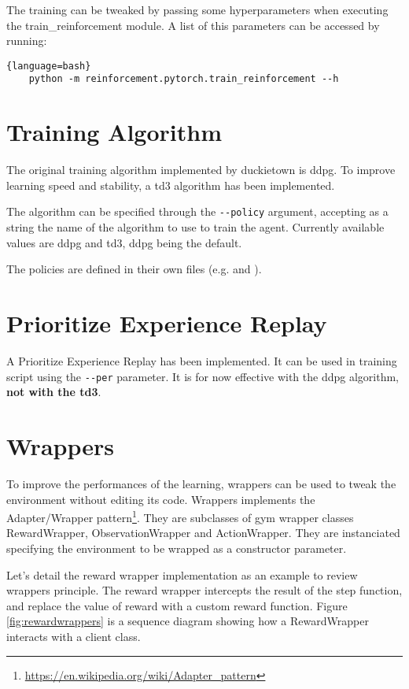 The training can be tweaked by passing some hyperparameters when executing the train\_reinforcement module.
A list of this parameters can be accessed by running:

\begin{lstlisting}{language=bash}
    python -m reinforcement.pytorch.train_reinforcement --h
\end{lstlisting}

\section{Training Algorithm}

The original training algorithm implemented by duckietown is ddpg\cite{ddpg}.
To improve learning speed and stability, a td3\cite{td3} algorithm has been implemented.

The algorithm can be specified through the \lstinline[language=bash]+--policy+ argument, accepting as a string the name of the algorithm to use to train the agent.
Currently available values are ddpg and td3, ddpg being the default.

The policies are defined in their own files (e.g.  and ).

\section{Prioritize Experience Replay}%

A Prioritize Experience Replay\cite{per} has been implemented.
It can be used in training script using the \lstinline[language=bash]+--per+ parameter.
It is for now effective with the ddpg algorithm, \textbf{not with the td3}.

\section{Wrappers}
To improve the performances of the learning, wrappers can be used to tweak the environment without editing its code.
Wrappers implements the Adapter/Wrapper pattern\footnote{\url{https://en.wikipedia.org/wiki/Adapter_pattern}}.
They are subclasses of gym wrapper classes RewardWrapper, ObservationWrapper and ActionWrapper.
They are instanciated specifying the environment to be wrapped as a constructor parameter.

Let's detail the reward wrapper implementation as an example to review wrappers principle.
The reward wrapper intercepts the result of the step function, and replace the value of reward with a custom reward function.
Figure \ref{fig:rewardwrappers} is a sequence diagram showing how a RewardWrapper interacts with a client class.

